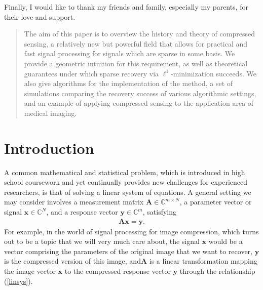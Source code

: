 \documentclass[12pt,a4paper]{amsart}
\numberwithin{equation}{section}
\theoremstyle{plain}
\theoremstyle{definition}
\newcommand{\BC}{\mathbb C}
\newcommand{\bdy}{\mathbf{y}}
\newcommand{\bdx}{\mathbf{x}}
\newcommand{\bdA}{\mathbf{A}}
\begin{document}
Finally, I would like to thank my friends and family, especially my parents, for their love and support.

\pagebreak

\address{Harvard University \\ Departments of Mathematics and Statistics \\
Cambridge MA 02138} 


\begin{abstract}
    The aim of this paper is to overview the history and theory of compressed sensing, a relatively new but powerful field that allows for practical and fast signal processing for signals which are sparse in some basis. We provide a geometric intuition for this requirement, as well as theoretical guarantees under which sparse recovery via $\ell^1$-minimization succeeds. We also give algorithms for the implementation of the method, a set of simulations comparing the recovery success of various algorithmic settings, and an example of applying compressed sensing to the application area of medical imaging.
\end{abstract}

\maketitle

\tableofcontents

\pagebreak

\section*{Introduction} A common mathematical and statistical problem, which is introduced in high school coursework and yet continually provides new challenges for experienced researchers, is that of solving a linear system of equations. A general setting we may consider involves a measurement matrix $\bdA\in\BC^{m\times N}$, a parameter vector or signal $\bdx\in\BC^N$, and a response vector $\bdy\in\BC^m$, satisfying
\begin{align}\label{linsys}
\bdA\bdx=\bdy.
\end{align}
For example, in the world of signal processing for image compression, which turns out to be a topic that we will very much care about, the signal $\bdx$ would be a vector comprising the parameters of the original image that we want to recover, $\bdy$ is the compressed version of this image, and$\bdA$ is a linear transformation mapping the image vector $\bdx$ to the compressed response vector $\bdy$ through the relationship (\ref{linsys}).
\end{document}
